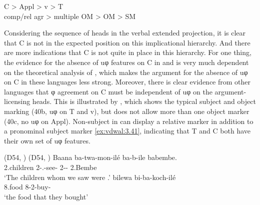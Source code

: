 \documentclass[output=paper]{langsci/langscibook}
\begin{document}
\ea\label{ex:vdwal:3.38}
    \gll    C > Appl > v > T\\
    {comp/rel agr} > {multiple OM} > OM > SM\\
\z

Considering the sequence of heads in the verbal extended projection, it is
clear that C is not in the expected position on this implicational hierarchy.
And there are more indications that C is not quite in place in this hierarchy.
For one thing, the evidence for the absence of uφ features on C in  and
 is very much dependent on the theoretical analysis of ,
which makes the argument for the absence of uφ on C in these languages less
strong. Moreover, there is clear evidence from other  languages that φ
agreement on C must be independent of uφ on the argument-licensing heads. This
is illustrated by , which shows the typical  subject and object
marking (40b, uφ on T and v), but does not allow more than one object marker
(40c, no uφ on Appl). Non-subject  in  can display a
relative marker in addition to a pronominal subject marker \eqref{ex:vdwal:3.41},
indicating that T and C both have their own set of uφ features.

\ea\label{ex:vdwal:3.39}  (D54, \citealt[103]{Iorio2014}) \label{bkm:Ref298742208}
	\z
\ex \label{ex:vdwal:3.40}  (D54, \citealt[152]{Iorio2014}) \label{bkm:Ref347515914}
	\ea\label{ex:vdwal:3.40a}
	\gll	 Baana  ba-twa-mon-ilé  ba-b-ile  babembe.\\
	    2.children  2\Rm{}-\Fpl.\Sm{}-see-\Pst{}  2\Sm-\Cop-\Pst{}  2.Bembe\\
	\glt    ‘The children whom we saw were .’
	\ex\label{ex:vdwal:3.40b}
	\gll	 bilewa  bi-ba-koch-ilé\\
	    8.food  8\Rm{}-2\Sm{}-buy-\Pst{}\\
	\glt    ‘the food that they bought’
	\z
\z
\end{document}
